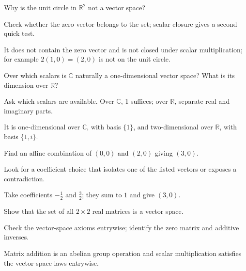 \begin{exercise}\label{exr:i01-04}
Why is the unit circle in $\mathbb R^2$ not a vector space?
\end{exercise}
\begin{hint}
Check whether the zero vector belongs to the set; scalar closure gives a second quick test.
\end{hint}
\begin{solution}
It does not contain the zero vector and is not closed under scalar multiplication; for example $2(1,0)=(2,0)$ is not on the unit circle.
\end{solution}

\begin{exercise}\label{exr:i01-05}
Over which scalars is $\mathbb C$ naturally a one-dimensional vector space? What is its dimension over $\mathbb R$?
\end{exercise}
\begin{hint}
Ask which scalars are available. Over \(\mathbb C\), \(1\) suffices; over \(\mathbb R\), separate real and imaginary parts.
\end{hint}
\begin{solution}
It is one-dimensional over $\mathbb C$, with basis $\{1\}$, and two-dimensional over $\mathbb R$, with basis $\{1,i\}$.
\end{solution}

\begin{exercise}\label{exr:i01-06}
Find an affine combination of $(0,0)$ and $(2,0)$ giving $(3,0)$.
\end{exercise}
\begin{hint}
Look for a coefficient choice that isolates one of the listed vectors or exposes a contradiction.
\end{hint}
\begin{solution}
Take coefficients $-\tfrac12$ and $\tfrac32$; they sum to $1$ and give $(3,0)$.
\end{solution}

\begin{exercise}\label{exr:i01-07}
Show that the set of all $2\times2$ real matrices is a vector space.
\end{exercise}
\begin{hint}
Check the vector-space axioms entrywise; identify the zero matrix and additive inverses.
\end{hint}
\begin{solution}
Matrix addition is an abelian group operation and scalar multiplication satisfies the vector-space laws entrywise.
\end{solution}

